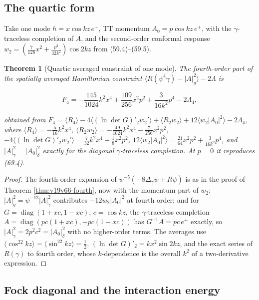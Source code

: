 \documentclass[11pt]{article}
\newtheorem{theorem}{Theorem}[section]
\theoremstyle{remark}
\begin{document}
\subsection{The quartic form}

Take one mode \(h=x\cos kz\,e^+\), TT momentum \(A_0=p\cos kz\,e^+\),
with the \(\gamma\)-traceless completion of \(A\), and the second-order
conformal response \(w_2=(\tfrac7{128}x^2+\tfrac{p^2}{32k^2})\cos2kz\)
from (59.4)--(59.5).

\begin{theorem}[Quartic averaged constraint of one mode]
\label{thm:v19v67-quartic}
The fourth-order part of the spatially averaged Hamiltonian constraint
\(\langle R(\psi^4\gamma)-|A|_g^2\rangle-2\Lambda\) is

\[
 F_4=-\frac{145}{1024}k^2x^4+\frac{109}{256}x^2p^2+\frac{3}{16k^2}p^4-2\Lambda_4,
                                                                    \tag{70.1}
\]

obtained from
\(F_4=\langle R_4\rangle-4\langle(\ln\det G)'_2w_2'\rangle+\langle R_2w_2\rangle
+12\langle w_2|A_0|^2\rangle-2\Lambda_4\),
where \(\langle R_4\rangle=-\tfrac5{16}k^2x^4\),
\(\langle R_2w_2\rangle=-\tfrac{49}{1024}k^2x^4-\tfrac7{256}x^2p^2\),
\(-4\langle(\ln\det G)'_2w_2'\rangle=\tfrac7{32}k^2x^4+\tfrac18x^2p^2\),
\(12\langle w_2|A_0|^2\rangle=\tfrac{21}{64}x^2p^2+\tfrac3{16k^2}p^4\),
and \(|A|^2_\gamma=|A_0|^2_\delta\) exactly for the diagonal
\(\gamma\)-traceless completion.  At \(p=0\) it reproduces (69.4).
\end{theorem}

\begin{proof}
The fourth-order expansion of \(\psi^{-5}(-8\Delta_\gamma\psi+R\psi)\)
is as in the proof of Theorem \ref{thm:v19v66-fourth}, now with the
momentum part of \(w_2\); \(|A|_g^2=\psi^{-12}|A|_\gamma^2\) contributes
\(-12w_2|A_0|^2\) at fourth order; and for \(G=\operatorname{diag}(1+xc,1-xc)\),
\(c=\cos kz\), the \(\gamma\)-traceless completion
\(A=\operatorname{diag}(pc(1+xc),-pc(1-xc))\) has
\(G^{-1}A=pc\,e^+\) exactly, so \(|A|_\gamma^2=2p^2c^2=|A_0|_\delta^2\)
with no higher-order terms.  The averages use
\(\langle\cos^22kz\rangle=\langle\sin^22kz\rangle=\tfrac12\),
\((\ln\det G)'_2=kx^2\sin2kz\), and the exact series of
\(R(\gamma)\) to fourth order, whose \(k\)-dependence is the overall
\(k^2\) of a two-derivative expression.
\end{proof}

\subsection{Fock diagonal and the interaction energy}
\end{document}
